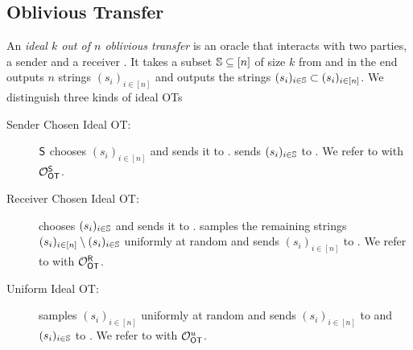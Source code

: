 \subsection{Oblivious Transfer}



\begin{definition}
An \emph{ideal $k$ out of $n$ oblivious transfer} is an oracle \OOT that interacts with two parties, a sender \send and a receiver \rec. It takes a subset  $\mathsf{\mathbb S}\subseteq[n]$ of size $k$ from \rec and in the end \send outputs $n$ strings $(s_i)_{i\in[n]}$ and \rec outputs the strings $(s_i)_{i\in\mathsf{\mathbb S}}\subset(s_i)_{i\in[n]}$. We distinguish three kinds of ideal OTs
\begin{description}
\item[Sender Chosen Ideal OT:] $\mathsf{S}$ chooses $(s_i)_{i\in[n]}$ and sends it to \OOT. \OOT sends $(s_i)_{i\in\mathsf{\mathbb S}}$ to \rec. We refer to \OOT with $\mathcal O_{\mathsf{OT}}^{\mathsf{S}}$.
\item[Receiver Chosen Ideal OT:] \rec chooses $(s_i)_{i\in\mathsf{\mathbb S}}$ and sends it to \OOT. \OOT samples the remaining strings $(s_i)_{i\in[n]}\setminus(s_i)_{i\in\mathsf{\mathbb S}}$ uniformly at random and sends $(s_i)_{i\in[n]}$ to \send. We refer to \OOT with $\mathcal O_{\mathsf{OT}}^{\mathsf{R}}$.
\item[Uniform Ideal OT:] \OOT samples $(s_i)_{i\in[n]}$ uniformly at random and sends $(s_i)_{i\in[n]}$ to \send and $(s_i)_{i\in\mathsf{\mathbb S}}$ to \rec. We refer to \OOT with $\mathcal O_{\mathsf{OT}}^{u}$.
\end{description}
\end{definition}

